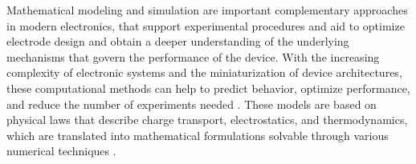 
Mathematical modeling and simulation are important complementary approaches in modern electronics, that support experimental procedures and aid to optimize electrode design and obtain a deeper understanding of the underlying mechanisms that govern the performance of the device. With the increasing complexity of electronic systems and the miniaturization of device architectures, these computational methods can help to predict behavior, optimize performance, and reduce the number of experiments needed \citep{markowichDrift1990}. 
These models are based on physical laws that describe charge transport, electrostatics, and thermodynamics, which are translated into mathematical formulations solvable through various numerical techniques \citep{delavariNernst2021,hassaniniaSimulation2008,moghadamDesign2013}. %

